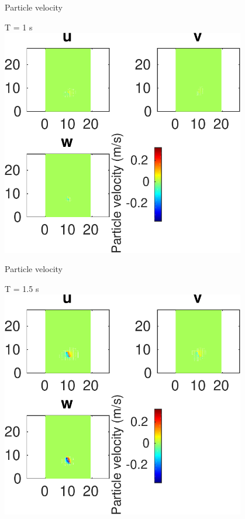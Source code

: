 \documentclass{beamer}
\begin{document}
\begin{frame}
 {Particle velocity}
 
 \centering \Large T = 1 s\\
 \includegraphics[width=0.8\textwidth]{images/horizontal_velo_00016}
 
\end{frame}

\begin{frame}
 {Particle velocity}
 
 \centering \Large T = 1.5 s\\
 \includegraphics[width=0.8\textwidth]{images/horizontal_velo_00021}
 
\end{frame}
\end{document}

